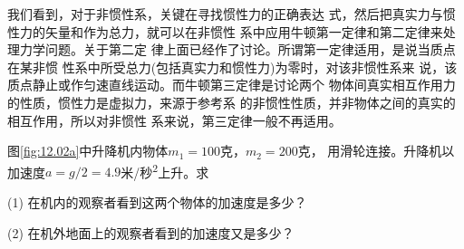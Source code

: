我们看到，对于非惯性系，关键在寻找惯性力的正确表达
式，然后把真实力与惯性力的矢量和作为总力，就可以在非惯性
系中应用牛顿第一定律和第二定律来处理力学问题。关于第二定
律上面已经作了讨论。所谓第一定律适用，是说当质点在某非惯
性系中所受总力(包括真实力和惯性力)为零时，对该非惯性系来
说，该质点静止或作匀速直线运动。而牛顿第三定律是讨论两个
物体间真实相互作用力的性质，惯性力是虚拟力，来源于参考系
的非惯性性质，并非物体之间的真实的相互作用，所以对非惯性
系来说，第三定律一般不再适用。

\begin{figure}[h]
  \vspace{1em}
  \centering
  \caption{}
  \label{fig:12.02}
  \vspace{0.5em}
\end{figure}

\example 图\ref{fig:12.02a}中升降机内物体$ m _ { 1 } = 1 0 0 $克，$ m _ { 2 } = 2 0 0 $克，
用滑轮连接。升降机以加速度$ a = g / 2 = 4 . 9 $米/秒\textsuperscript{2}上升。求

(1) 在机内的观察者看到这两个物体的加速度是多少？

(2) 在机外地面上的观察者看到的加速度又是多少？

